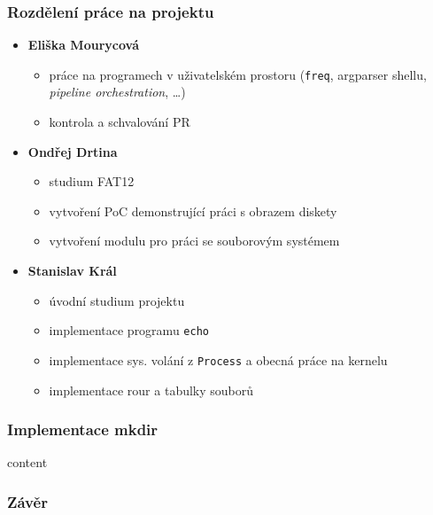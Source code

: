 \documentclass[xcolor=dvipsnames]{beamer}
\begin{document}
\begin{frame}
\frametitle{Rozdělení práce na projektu}
    \begingroup
    \small
	\begin{itemize}
        \setlength\itemsep{0.1em}
        \item \textbf{Eliška Mourycová}
        \begin{itemize}
            \setlength\itemsep{0.1em}
            \item práce na programech v uživatelském prostoru (\texttt{freq}, argparser shellu, \textit{pipeline orchestration}, \ldots)
            \item kontrola a schvalování PR
        \end{itemize}
        \item \textbf{Ondřej Drtina}
        \begin{itemize}
            \setlength\itemsep{0.1em}
            \item studium FAT12 
            \item vytvoření PoC demonstrující práci s obrazem diskety
            \item vytvoření modulu pro práci se souborovým systémem
        \end{itemize}
        \item \textbf{Stanislav Král}
        \begin{itemize}
            \setlength\itemsep{0.1em}
            \item úvodní studium projektu 
            \item implementace programu \texttt{echo}
            \item implementace sys. volání z \texttt{Process} a obecná práce na kernelu
            \item implementace rour a tabulky souborů
        \end{itemize}
  	\end{itemize}
    \endgroup
\end{frame}

\begin{frame}[fragile]
\frametitle{Implementace mkdir}
    content
\end{frame}

\begin{frame}
\frametitle{Závěr}

\end{frame}
\end{document}
